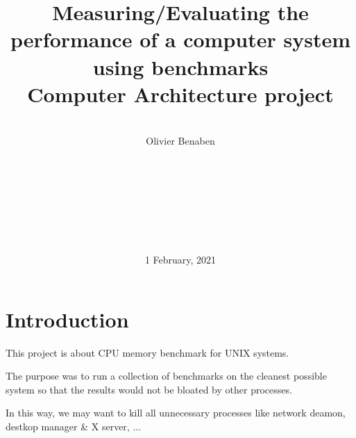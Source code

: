 \title{
\hline \vspace{.3cm}
{\Huge Measuring/Evaluating the performance of a computer system using benchmarks
\vspace{.3cm} \hline \vspace{1cm}
{\large\linebreak\\}}{\Large Computer Architecture project
\\\linebreak\linebreak}
\linebreak{\Huge[ISTY]}
}
\author{\\Olivier Benaben\\
\\\\
\\
\\\\
\\
\\
}
\date{1 February, 2021}
\maketitle
\newpage





\section{Introduction}\label{Introduction}%
    This project is about CPU memory benchmark for UNIX systems.
    
    The purpose was to run a collection of benchmarks on the cleanest possible system so that the results would not be bloated by other processes.
    
    In this way, we may want to kill all unnecessary processes like network deamon, destkop manager \& X server, ...\\
    
